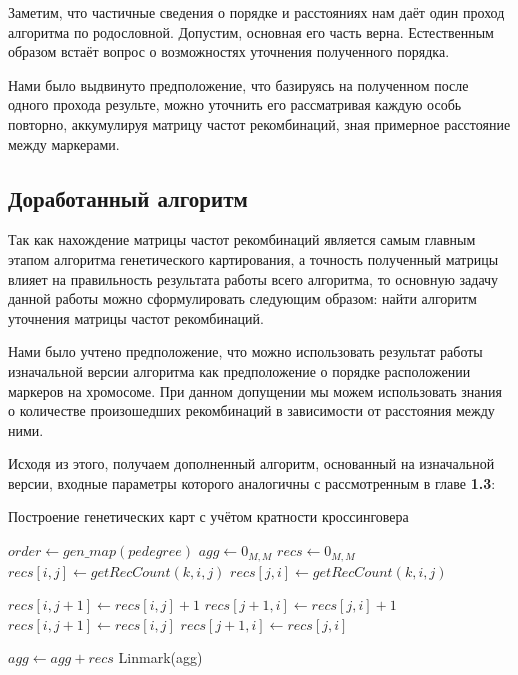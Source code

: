 \documentclass{matmex-diploma-custom}
\begin{document}
Заметим, что частичные сведения о порядке и расстояниях нам даёт один
проход алгоритма по родословной. Допустим, основная его часть
верна. Естественным образом встаёт вопрос о возможностях уточнения
полученного порядка.

Нами было выдвинуто предположение, что базируясь на полученном после
одного прохода результе, можно уточнить его рассматривая каждую особь
повторно, аккумулируя матрицу частот рекомбинаций, зная примерное
расстояние между маркерами.

\subsection{Доработанный алгоритм}

Так как нахождение матрицы частот рекомбинаций является самым главным
этапом алгоритма генетического картирования, а точность полученный
матрицы влияет на правильность результата работы всего алгоритма, то
основную задачу данной работы можно сформулировать следующим образом:
найти алгоритм уточнения матрицы частот рекомбинаций.

Нами было учтено предположение, что можно использовать результат
работы изначальной версии алгоритма как предположение о порядке
расположении маркеров на хромосоме. При данном допущении мы можем
использовать знания о количестве произошедших рекомбинаций в
зависимости от расстояния между ними.

Исходя из этого, получаем дополненный алгоритм, основанный на
изначальной версии, входные параметры которого аналогичны с
рассмотренным в главе \textbf{1.3}:

\begin{algorithm}
  \caption{Построение генетических карт с учётом кратности кроссинговера}
  \label{newalgo}
   \begin{algorithmic}[1]
    \State $order \gets gen\_map(pedegree)$
    \State $agg \gets 0_{M, M}$
    \State $recs \gets 0_{M, M}$
      \State $recs[i, j] \gets getRecCount(k, i, j)$
      \State $recs[j, i] \gets getRecCount(k, i, j)$
    \EndFor
    \EndFor


    \State $recs[i, j+1] \gets recs[i, j] +1$
    \State $recs[j+1, i] \gets recs[j, i] +1$
    \EndIf
    \State $recs[i, j+1] \gets recs[i, j]$
    \State $recs[j+1, i] \gets recs[j, i]$
    \EndIf

    \EndFor
    \EndFor
    \State $agg \gets agg + recs$
    \EndFor
    \State \Return Linmark(agg)
    \EndFunction
  \end{algorithmic}
\end{algorithm}
\end{document}
